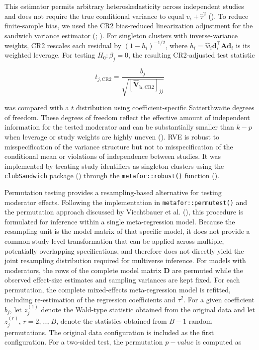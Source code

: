 \documentclass[
  man,
  longtable,
  nolmodern,
  notxfonts,
  notimes,
  colorlinks=true,linkcolor=blue,citecolor=blue,urlcolor=blue]{apa7}
\begin{document}
This estimator permits arbitrary heteroskedasticity across independent
studies and does not require the true conditional variance to equal
\(v_i+\hat\tau^2\) (). To reduce
finite-sample bias, we used the CR2 bias-reduced linearization
adjustment for the sandwich variance estimator
(;
). For singleton clusters with
inverse-variance weights, CR2 rescales each residual by
\((1-h_i)^{-1/2}\), where
\(h_i=\hat w_i\mathbf{d}_i^{\top}\mathbf{A}\mathbf{d}_i\) is its
weighted leverage. For testing \(H_0:\beta_j=0\), the resulting
CR2-adjusted test statistic

\[
t_{j,\mathrm{CR2}}
=
\frac{b_j}
{\sqrt{[\widehat{\mathbf{V}}_{\mathbf{b},\mathrm{CR2}}]_{jj}}}
\]

was compared with a \(t\) distribution using coefficient-specific
Satterthwaite degrees of freedom. These degrees of freedom reflect the
effective amount of independent information for the tested moderator and
can be substantially smaller than \(k-p\) when leverage or study weights
are highly uneven (). RVE is
robust to misspecification of the variance structure but not to
misspecification of the conditional mean or violations of independence
between studies. It was implemented by treating study identifiers as
singleton clusters using the \texttt{clubSandwich} package
() through the
\texttt{metafor::robust()} function
().

Permutation testing provides a resampling-based alternative for testing
moderator effects. Following the implementation in
\texttt{metafor::permutest()} and the permutation approach discussed by
Viechtbauer et al. (), this
procedure is formulated for inference within a single meta-regression
model. Because the resampling unit is the model matrix of that specific
model, it does not provide a common study-level transformation that can
be applied across multiple, potentially overlapping specifications, and
therefore does not directly yield the joint resampling distribution
required for multiverse inference. For models with moderators, the rows
of the complete model matrix \(\mathbf{D}\) are permuted while the
observed effect-size estimates and sampling variances are kept fixed.
For each permutation, the complete mixed-effects meta-regression model
is refitted, including re-estimation of the regression coefficients and
\(\tau^2\). For a given coefficient \(b_j\), let \(z_j^{(1)}\) denote
the Wald-type statistic obtained from the original data and let
\(z_j^{(r)}\), \(r=2,\ldots,B\), denote the statistics obtained from
\(B-1\) random permutations. The original data configuration is included
as the first configuration. For a two-sided test, the permutation
\(p-value\) is computed as
\end{document}
